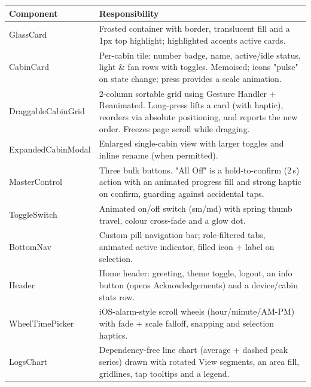 \documentclass[11pt,a4paper]{article}
\newcommand{\code}[1]{\colorbox{codebg}{\ttfamily\small #1}}
\begin{document}
\begin{longtable}{@{}p{}p{}@{}}
  \toprule
  \textbf{Component} & \textbf{Responsibility} \\
  \midrule
  \endhead
  \code{GlassCard}      & Frosted container with border, translucent fill and a
                          1px top highlight; \code{highlighted} accents active
                          cards. \\
  \code{CabinCard}      & Per-cabin tile: number badge, name, active/idle status,
                          light \& fan rows with toggles. Memoised; icons "pulse"
                          on state change; press provides a scale animation. \\
  \code{DraggableCabinGrid} & 2-column sortable grid using Gesture Handler +
                          Reanimated. Long-press lifts a card (with haptic),
                          reorders via absolute positioning, and reports the new
                          order. Freezes page scroll while dragging. \\
  \code{ExpandedCabinModal} & Enlarged single-cabin view with larger toggles and
                          inline rename (when permitted). \\
  \code{MasterControl}  & Three bulk buttons. "All Off" is a hold-to-confirm
                          (2\,s) action with an animated progress fill and strong
                          haptic on confirm, guarding against accidental taps. \\
  \code{ToggleSwitch}   & Animated on/off switch (\code{sm}/\code{md}) with spring
                          thumb travel, colour cross-fade and a glow dot. \\
  \code{BottomNav}      & Custom pill navigation bar; role-filtered tabs, animated
                          active indicator, filled icon + label on selection. \\
  \code{Header}         & Home header: greeting, theme toggle, logout, an info
                          button (opens Acknowledgements) and a device/cabin
                          stats row. \\
  \code{WheelTimePicker}& iOS-alarm-style scroll wheels (hour/minute/AM-PM) with
                          fade + scale falloff, snapping and selection haptics. \\
  \code{LogsChart}      & Dependency-free line chart (average + dashed peak
                          series) drawn with rotated \code{View} segments, an area
                          fill, gridlines, tap tooltips and a legend. \\

\end{longtable}
\end{document}
